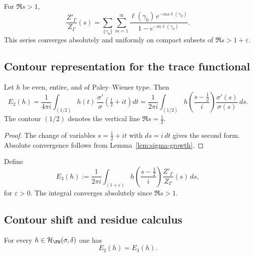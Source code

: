 \begin{lemma}
\label{lem:zeta-log-derivative}
For $\Re s>1$,
\[
\frac{Z'_\Gamma}{Z_\Gamma}(s)
= \sum_{\{\gamma_0\}}\sum_{m=1}^{\infty}
\frac{\ell(\gamma_0)\,e^{-ms\ell(\gamma_0)}}{1 - e^{-m\ell(\gamma_0)}}.
\]
This series converges absolutely and uniformly on compact subsets of $\Re s>1+\varepsilon$. \relax
\end{lemma}

\subsection{Contour representation for the trace functional}
\label{subsec:ch4-part4-contour-rep} \relax

\begin{lemma}
\label{lem:contour-E2}
Let $h$ be even, entire, and of Paley–Wiener type. Then
\[
E_2(h)
= \frac{1}{4\pi i}\int_{(1/2)} h(t)\,\frac{\sigma'}{\sigma}\!\left(\tfrac12+it\right) dt
= \frac{1}{2\pi i}\int_{(1/2)} h\!\left(\frac{s-\tfrac12}{i}\right)\frac{\sigma'(s)}{\sigma(s)}\,ds.
\]
The contour $(1/2)$ denotes the vertical line $\Re s=\tfrac12$.
\end{lemma}

\begin{proof}\relax
The change of variables $s=\tfrac12+it$ with $ds=i\,dt$ gives the second form.
Absolute convergence follows from Lemma~\ref{lem:sigma-growth}. \relax
\end{proof}

\begin{definition}
\label{def:E3}
Define
\[
E_3(h)
:= \frac{1}{2\pi i}\int_{(1+\varepsilon)} h\!\left(\frac{s-\tfrac12}{i}\right)
\frac{Z'_\Gamma}{Z_\Gamma}(s)\,ds,
\]
for $\varepsilon>0$. The integral converges absolutely since $\Re s>1$.
\end{definition}

\subsection{Contour shift and residue calculus}
\label{subsec:ch4-part4-shift} \relax

\begin{theorem}[Equivalence $E_2(h)=E_3(h)$]
\label{thm:E2E3}
For every $h\in\mathcal{H}_{\PW}(\sigma,\delta)$ one has
\[
E_2(h)=E_3(h).
\]
\end{theorem}

